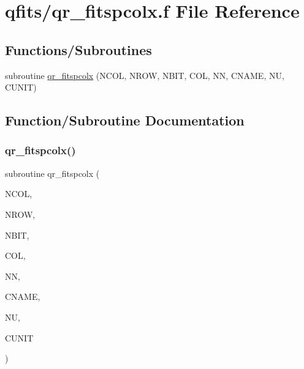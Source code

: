 \hypertarget{qr__fitspcolx_8f}{}\section{qfits/qr\+\_\+fitspcolx.f File Reference}
\label{qr__fitspcolx_8f}
\subsection*{Functions/\+Subroutines}
\begin{DoxyCompactItemize}
\item 
subroutine \hyperlink{qr__fitspcolx_8f_a00af226c35dda456393263c3e43c43cd}{qr\+\_\+fitspcolx} (N\+C\+OL, N\+R\+OW, N\+B\+IT, C\+OL, NN, C\+N\+A\+ME, NU, C\+U\+N\+IT)
\end{DoxyCompactItemize}


\subsection{Function/\+Subroutine Documentation}
\mbox{\label{qr__fitspcolx_8f_a00af226c35dda456393263c3e43c43cd}} 
\subsubsection{\texorpdfstring{qr\+\_\+fitspcolx()}{qr\_fitspcolx()}}
{\footnotesize\ttfamily subroutine qr\+\_\+fitspcolx (\begin{DoxyParamCaption}\item[{integer}]{N\+C\+OL,  }\item[{integer}]{N\+R\+OW,  }\item[{integer}]{N\+B\+IT,  }\item[{character$\ast$(nbit)}]{C\+OL,  }\item[{integer}]{NN,  }\item[{character$\ast$(nn)}]{C\+N\+A\+ME,  }\item[{integer}]{NU,  }\item[{character$\ast$(nu)}]{C\+U\+N\+IT }\end{DoxyParamCaption})}

